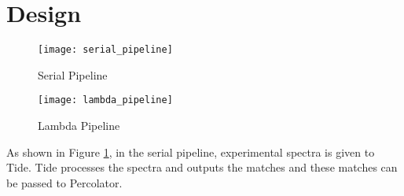 \section{Design}
\begin{figure}
  \centering
  \texttt{[image: serial\_pipeline]}
  \caption{Serial Pipeline}
  \label{fig:serial_pipeline}
\end{figure}
\begin{figure}
  \centering
  \texttt{[image: lambda\_pipeline]}
  \caption{Lambda Pipeline}
  \label{fig:lambda_pipeline}
\end{figure}
As shown in Figure \ref{fig:serial_pipeline}, in the serial pipeline, experimental spectra is given to Tide. Tide processes the spectra and outputs the matches and these matches can be passed to Percolator.



